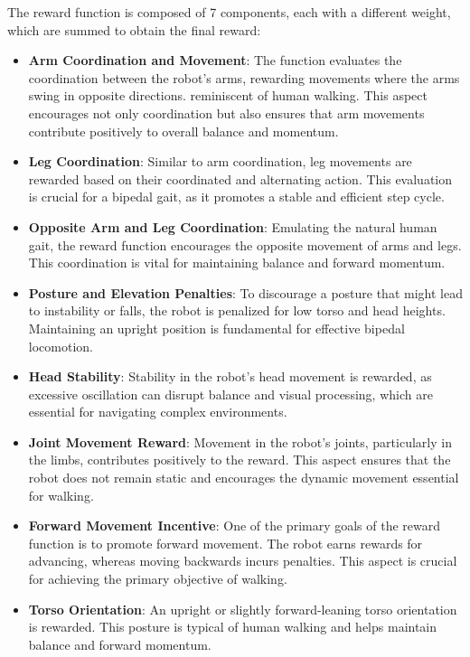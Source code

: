\documentclass[conference]{IEEEtran}
\begin{document}
The reward function is composed of 7 components, each with a different weight, which are summed to obtain the final reward:
\begin{itemize}
    \item \textbf{Arm Coordination and Movement}: The function evaluates the coordination between the robot's arms, rewarding movements where the arms swing in opposite directions.
          reminiscent of human walking. This aspect encourages not only coordination but also ensures that arm movements contribute positively to overall balance and momentum.
    \item \textbf{Leg Coordination}: Similar to arm coordination, leg movements are rewarded based on their coordinated and alternating action. This evaluation is crucial for a bipedal gait, as it promotes a stable and efficient step cycle.
    \item \textbf{Opposite Arm and Leg Coordination}: Emulating the natural human gait, the reward function encourages the opposite movement of arms and legs. This coordination is vital for maintaining balance and forward momentum.
    \item \textbf{Posture and Elevation Penalties}: To discourage a posture that might lead to instability or falls, the robot is penalized for low torso and head heights. Maintaining an upright position is fundamental for effective bipedal locomotion.
    \item \textbf{Head Stability}: Stability in the robot's head movement is rewarded, as excessive oscillation can disrupt balance and visual processing, which are essential for navigating complex environments.
    \item \textbf{Joint Movement Reward}: Movement in the robot's joints, particularly in the limbs, contributes positively to the reward. This aspect ensures that the robot does not remain static and encourages the dynamic movement essential for walking.
    \item \textbf{Forward Movement Incentive}: One of the primary goals of the reward function is to promote forward movement. The robot earns rewards for advancing, whereas moving backwards incurs penalties. This aspect is crucial for achieving the primary objective of walking.
    \item \textbf{Torso Orientation}: An upright or slightly forward-leaning torso orientation is rewarded. This posture is typical of human walking and helps maintain balance and forward momentum.
\end{itemize}
\end{document}
